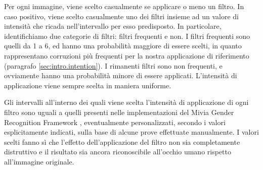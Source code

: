 Per ogni immagine, viene scelto casualmente se applicare o meno un filtro. In caso positivo, viene scelto casualmente uno dei filtri insieme ad un valore di intensità che ricada nell'intervallo per esso predisposto. In particolare, identifichiamo due categorie di filtri: filtri frequenti e non. I filtri frequenti sono quelli da 1 a 6, ed hanno una probabilità maggiore di essere scelti, in quanto rappresentano corruzioni più frequenti per la nostra applicazione di riferimento (paragrafo \ref{sec:intro.intention}). I rimanenti filtri sono non frequenti, e ovviamente hanno una probabilità minore di essere applicati. L'intensità di applicazione viene sempre scelta in maniera uniforme.

Gli intervalli all'interno dei quali viene scelta l'intensità di applicazione di ogni filtro sono uguali a quelli presenti nelle implementazioni del Mivia Gender Recognition Framework \cite{miviagender}, eventualmente personalizzati, secondo i valori esplicitamente indicati, sulla base di alcune prove effettuate manualmente.
I valori scelti fanno sì che l'effetto dell'applicazione del filtro non sia completamente distruttivo e il risultato sia ancora riconoscibile all'occhio umano rispetto all'immagine originale.

